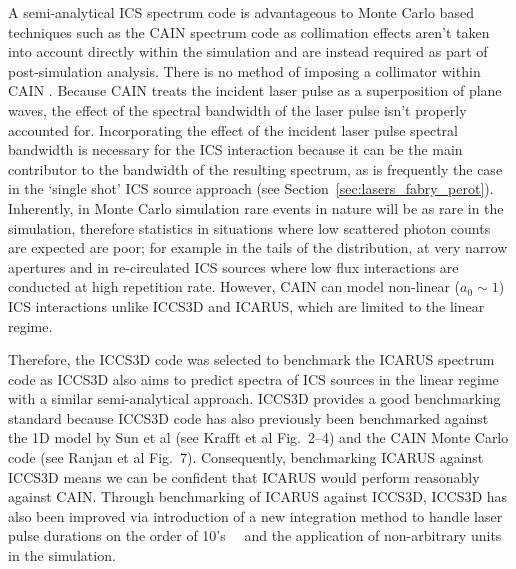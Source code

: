 \documentclass[../main.tex]{subfiles}
\begin{document}
A semi-analytical ICS spectrum code is advantageous to Monte Carlo based techniques such as the \textsc{CAIN} spectrum code as collimation effects aren't taken into account directly within the simulation and are instead required as part of post-simulation analysis. There is no method of imposing a collimator within \textsc{CAIN} \cite{chen1995cain}. Because \textsc{CAIN} treats the incident laser pulse as a superposition of plane waves, the effect of the spectral bandwidth of the laser pulse isn't properly accounted for. Incorporating the effect of the incident laser pulse spectral bandwidth is necessary for the ICS interaction because it can be the main contributor to the bandwidth of the resulting spectrum, as is frequently the case in the `single shot' ICS source approach (see Section~\ref{sec:lasers_fabry_perot}). Inherently, in Monte Carlo simulation rare events in nature will be as rare in the simulation, therefore statistics in situations where low scattered photon counts are expected are poor; for example in the tails of the distribution, at very narrow apertures \cite{ranjan2018simulation} and in re-circulated ICS sources where low flux interactions are conducted at high repetition rate. However, \textsc{CAIN} can model non-linear ($a_{0} \sim 1$) ICS interactions unlike \textsc{ICCS3D} and \textsc{ICARUS}, which are limited to the linear regime.  

Therefore, the \textsc{ICCS3D} code \cite{krafft2016laser,ranjan2018simulation} was selected to benchmark the \textsc{ICARUS} spectrum code as \textsc{ICCS3D} also aims to predict spectra of ICS sources in the linear regime with a similar semi-analytical approach. \textsc{ICCS3D} provides a good benchmarking standard because  \textsc{ICCS3D} code has also previously been benchmarked against the 1D model by Sun et al \cite{sun2009energy} (see Krafft et al \cite{krafft2016laser} Fig.~2--4) and the \textsc{CAIN} Monte Carlo code (see Ranjan et al\cite{ranjan2018simulation} Fig.~7). Consequently, benchmarking \textsc{ICARUS} against \textsc{ICCS3D} means we can be confident that \textsc{ICARUS} would perform reasonably against \textsc{CAIN}. Through benchmarking of \textsc{ICARUS} against \textsc{ICCS3D}, \textsc{ICCS3D} has also been improved via introduction of a new integration method to handle laser pulse durations on the order of 10's~\si{\pico\seconds} and the application of non-arbitrary units in the simulation.
\end{document}
